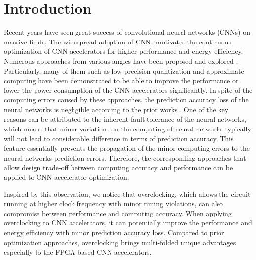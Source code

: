 \section{Introduction} \label{sec:intro}
Recent years have seen great success of  
convolutional neural networks (CNNs) on massive fields.
The widespread adoption of CNNs motivates the 
continuous optimization of CNN accelerators for higher 
performance and energy efficiency. 
Numerous approaches from various 
angles have been proposed and explored \cite{EIE_han_2016}\cite{deepburing_12}. 
Particularly, many of them such as 
low-precision quantization \cite{Hwang2014_17} 
and approximate computing \cite{Approximate_Multiplier_31}
have been demonstrated to 
be able to improve the performance or lower the power consumption of the CNN 
accelerators significantly. In spite of the computing errors caused by these approaches, 
the prediction accuracy loss of the neural networks is negligible according to the prior works \cite{deep_compress_han_2015}.
One of the key reasons can be attributed to the inherent fault-tolerance of 
the neural networks, which means that minor variations on the 
computing of neural networks typically will not lead to considerable 
difference in terms of prediction accuracy. This 
feature essentially prevents the propagation of 
the minor computing errors to the neural networks prediction errors. 
Therefore, the corresponding approaches that allow design trade-off 
between computing accuracy and performance can be applied to CNN 
accelerator optimization.

Inspired by this observation, we notice that overclocking, which 
allows the circuit running at higher clock frequency with minor 
timing violations, can also compromise between performance 
and computing accuracy. When applying overclocking to CNN accelerators, 
it can potentially improve the performance and energy 
efficiency with minor prediction accuracy loss.
Compared to prior optimization approaches, overclocking brings 
multi-folded unique advantages especially to the FPGA based CNN 
accelerators. 

